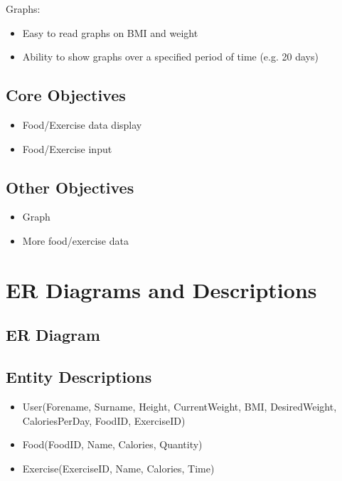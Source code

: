 Graphs:
\begin{itemize}
\item Easy to read graphs on BMI and weight
\item Ability to show graphs over a specified period of time (e.g. 20 days)
\end{itemize}

\subsection{Core Objectives}

\begin{itemize}
\item Food/Exercise data display
\item Food/Exercise input
\end{itemize}

\subsection{Other Objectives}

\begin{itemize}
\item Graph
\item More food/exercise data
\end{itemize}


\section{ER Diagrams and Descriptions}

\subsection{ER Diagram}

\subsection{Entity Descriptions}

\begin{itemize}
\item User(Forename, Surname, Height, CurrentWeight, BMI, DesiredWeight, CaloriesPerDay, FoodID, ExerciseID)
\item Food(FoodID, Name, Calories, Quantity)
\item Exercise(ExerciseID, Name, Calories, Time)
\end{itemize}

